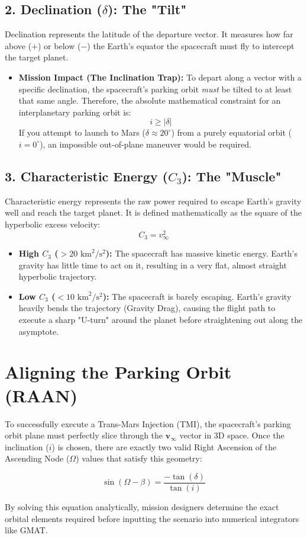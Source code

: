 \documentclass[11pt, letterpaper]{article}
\begin{document}
\subsection*{2. Declination ($\delta$): The "Tilt"}
Declination represents the latitude of the departure vector. It measures how far above ($+$) or below ($-$) the Earth's equator the spacecraft must fly to intercept the target planet.
\begin{itemize}
    \item \textbf{Mission Impact (The Inclination Trap):} To depart along a vector with a specific declination, the spacecraft's parking orbit \textit{must} be tilted to at least that same angle. Therefore, the absolute mathematical constraint for an interplanetary parking orbit is:
    \begin{equation}
        i \ge |\delta|
    \end{equation}
    If you attempt to launch to Mars ($\delta \approx 20^\circ$) from a purely equatorial orbit ($i = 0^\circ$), an impossible out-of-plane maneuver would be required.
\end{itemize}

\subsection*{3. Characteristic Energy ($C_3$): The "Muscle"}
Characteristic energy represents the raw power required to escape Earth's gravity well and reach the target planet. It is defined mathematically as the square of the hyperbolic excess velocity:
\begin{equation}
    C_3 = v_\infty^2
\end{equation}
\begin{itemize}
    \item \textbf{High $C_3$ ($> 20 \text{ km}^2/\text{s}^2$):} The spacecraft has massive kinetic energy. Earth's gravity has little time to act on it, resulting in a very flat, almost straight hyperbolic trajectory.
    \item \textbf{Low $C_3$ ($< 10 \text{ km}^2/\text{s}^2$):} The spacecraft is barely escaping. Earth's gravity heavily bends the trajectory (Gravity Drag), causing the flight path to execute a sharp "U-turn" around the planet before straightening out along the asymptote.
\end{itemize}

\section*{Aligning the Parking Orbit (RAAN)}
To successfully execute a Trans-Mars Injection (TMI), the spacecraft's parking orbit plane must perfectly slice through the $\boldsymbol{v}_\infty$ vector in 3D space. Once the inclination ($i$) is chosen, there are exactly two valid Right Ascension of the Ascending Node ($\Omega$) values that satisfy this geometry:

\begin{equation}
    \sin(\Omega - \beta) = \frac{-\tan(\delta)}{\tan(i)}
\end{equation}

By solving this equation analytically, mission designers determine the exact orbital elements required before inputting the scenario into numerical integrators like GMAT.
\end{document}
